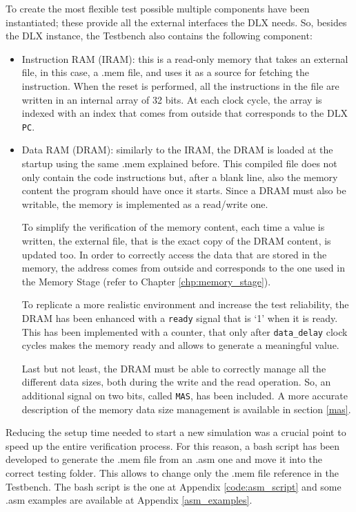 To create the most flexible test possible multiple components have been instantiated; these provide all the external interfaces the DLX needs. So, besides the DLX instance, the Testbench also contains the following component:
\begin{itemize} 
    \item Instruction RAM (IRAM): this is a read-only memory that takes an external file, in this case, a .mem file, and uses it as a source for fetching the instruction. When the reset is performed, all the instructions in the file are written in an internal array of 32 bits. At each clock cycle, the array is indexed with an index that comes from outside that corresponds to the DLX \texttt{PC}.
    \item Data RAM (DRAM): similarly to the IRAM, the DRAM is loaded at the startup using the same .mem explained before. This compiled file does not only contain the code instructions but, after a blank line, also the memory content the program should have once it starts. Since a DRAM must also be writable, the memory is implemented as a read/write one. 
    
    To simplify the verification of the memory content, each time a value is written, the external file, that is the exact copy of the DRAM content, is updated too.
    In order to correctly access the data that are stored in the memory, the address comes from outside and corresponds to the one used in the Memory Stage (refer to Chapter \ref{chp:memory_stage}).
    
    To replicate a more realistic environment and increase the test reliability, the DRAM has been enhanced with a \texttt{ready} signal that is `1' when it is ready. This has been implemented with a counter, that only after \texttt{data\_delay} clock cycles makes the memory ready and allows to generate a meaningful value.
    
    Last but not least, the DRAM must be able to correctly manage all the different data sizes, both during the write and the read operation. So, an additional signal on two bits, called \texttt{MAS}, has been included. A more accurate description of the memory data size management is available in section \ref{mas}.
\end{itemize}

Reducing the setup time needed to start a new simulation was a crucial point to speed up the entire verification process. For this reason, a bash script has been developed to generate the .mem file from an .asm one and move it into the correct testing folder. This allows to change only the .mem file reference in the Testbench. The bash script is the one at Appendix \ref{code:asm_script} and some .asm examples are available at Appendix \ref{asm_examples}.  

